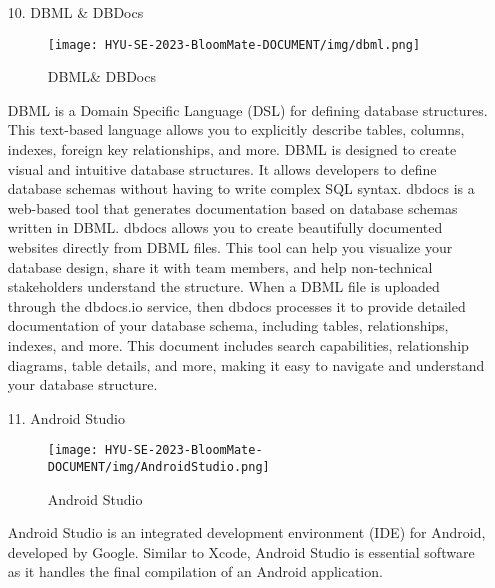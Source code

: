 \documentclass[conference, a4paper]{IEEEtran}
\begin{document}
\begin{enumerate}
    \item[10.]DBML \& DBDocs
    \begin{figure}[h]
    \centering
    \texttt{[image: HYU-SE-2023-BloomMate-DOCUMENT/img/dbml.png]}
    \label{fig:DBML}
    \caption{DBML\& DBDocs} 
    \end{figure} 
    \item[] DBML is a Domain Specific Language (DSL) for defining database structures. This text-based language allows you to explicitly describe tables, columns, indexes, foreign key relationships, and more. DBML is designed to create visual and intuitive database structures. It allows developers to define database schemas without having to write complex SQL syntax. dbdocs is a web-based tool that generates documentation based on database schemas written in DBML. dbdocs allows you to create beautifully documented websites directly from DBML files. This tool can help you visualize your database design, share it with team members, and help non-technical stakeholders understand the structure. When a DBML file is uploaded through the dbdocs.io service, then dbdocs processes it to provide detailed documentation of your database schema, including tables, relationships, indexes, and more. This document includes search capabilities, relationship diagrams, table details, and more, making it easy to navigate and understand your database structure.\\
    
    
    \item[11.]Android Studio
    \begin{figure}[h]
    \centering
    \texttt{[image: HYU-SE-2023-BloomMate-DOCUMENT/img/AndroidStudio.png]}
    \label{fig:AndroidStudio}
    \caption{Android Studio} 
    \end{figure}
    \item[]Android Studio is an integrated development environment (IDE) for Android, developed by Google. Similar to Xcode, Android Studio is essential software as it handles the final compilation of an Android application.\\
    

\end{enumerate}
\end{document}
